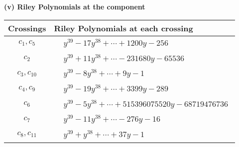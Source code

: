 \documentclass[1p]{elsarticle_modified}
\theoremstyle{definition}
\begin{document}
\flushleft \textbf{(v) Riley Polynomials at the component}\newline \\
\begin{tabular}{m{50pt}|m{274pt}}
Crossings & \hspace{64pt}Riley Polynomials at each crossing \\
\hline $$\begin{aligned}c_{1},c_{5}\end{aligned}$$&$\begin{aligned}
&y^{39}-17 y^{38}+\cdots+1200 y-256
\end{aligned}$\\
\hline $$\begin{aligned}c_{2}\end{aligned}$$&$\begin{aligned}
&y^{39}+11 y^{38}+\cdots-231680 y-65536
\end{aligned}$\\
\hline $$\begin{aligned}c_{3},c_{10}\end{aligned}$$&$\begin{aligned}
&y^{39}-8 y^{38}+\cdots+9 y-1
\end{aligned}$\\
\hline $$\begin{aligned}c_{4},c_{9}\end{aligned}$$&$\begin{aligned}
&y^{39}-19 y^{38}+\cdots+3399 y-289
\end{aligned}$\\
\hline $$\begin{aligned}c_{6}\end{aligned}$$&$\begin{aligned}
&y^{39}-5 y^{38}+\cdots+515396075520 y-68719476736
\end{aligned}$\\
\hline $$\begin{aligned}c_{7}\end{aligned}$$&$\begin{aligned}
&y^{39}-11 y^{38}+\cdots-276 y-16
\end{aligned}$\\
\hline $$\begin{aligned}c_{8},c_{11}\end{aligned}$$&$\begin{aligned}
&y^{39}+y^{38}+\cdots+37 y-1
\end{aligned}$\\
\hline
\end{tabular}\\~\\
\end{document}
